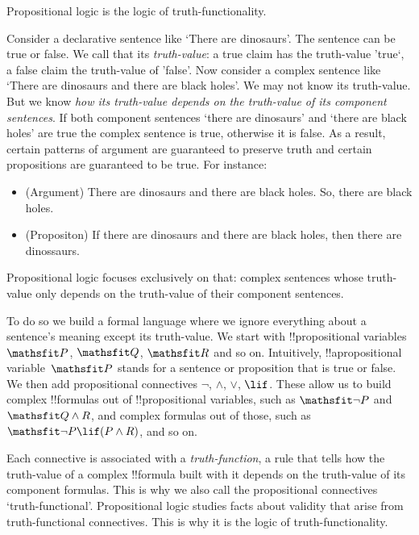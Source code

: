 \documentclass[../../../include/open-logic-section]{subfiles}
\begin{document}


Propositional logic is the logic of truth-functionality.

Consider a declarative sentence like `There are dinosaurs'. The sentence can be true or false. We call that its \emph{truth-value}: a true claim has the truth-value 'true`, a false claim the truth-value of 'false'. Now consider a complex sentence like `There are dinosaurs and there are black holes'. We may not know its truth-value. But we know \emph{how its truth-value depends on the truth-value of its component sentences}. If both component sentences `there are dinosaurs' and `there are black holes' are true the complex sentence is true, otherwise it is false. As a result, certain patterns of argument are guaranteed to preserve truth and certain propositions are guaranteed to be true. For instance:

\begin{itemize}
	\item (Argument) There are dinosaurs and there are black
holes. So, there are black holes.
	\item (Propositon) If there are dinosaurs and there are black holes, then there are dinossaurs.
\end{itemize}


Propositional logic focuses exclusively on that: complex sentences whose truth-value only depends on the truth-value of their component sentences. 

To do so we build a formal language where we ignore everything about a sentence's meaning except its truth-value. We start with !!{propositional variable}s $\Obj P$, $\Obj Q$, $\Obj R$ and so on. Intuitively, !!a{propositional variable}~$\Obj P$ stands for a sentence or proposition that is true or false. We then add propositional connectives $\lnot$, $\land$, $\lor$, $\lif$. These allow us to build complex !!{formula}s out of !!{propositional variable}s, such as $\Obj{\lnot P}$ and $\Obj{Q \land R}$, and complex formulas out of those, such as $\Obj {\lnot P \lif (P \land R)}$, and so on. 

Each connective is associated with a \emph{truth-function}, a rule that tells how the truth-value of a complex !!{formula} built with it depends on the truth-value of its component formulas. This is why we also call the propositional connectives `truth-functional'. Propositional logic studies facts about validity that arise from truth-functional connectives. This is why it is the logic of truth-functionality. 
\end{document}
